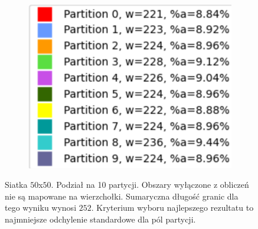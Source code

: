\begin{figure}[h]
\begin{subfigure}{.33\textwidth}
    \includegraphics[width=0.9\linewidth]{images/results/m_k/with/14/results}
    \caption[short]{}
\end{subfigure}
\caption{Siatka $50$x$50$. Podział na 10 partycji.
Obszary wyłączone z obliczeń nie są mapowane na wierzchołki.
Sumaryczna długość granic dla tego wyniku wynosi $252$.
Kryterium wyboru najlepszego rezultatu to najmniejsze odchylenie standardowe dla pól partycji.}
\label{result:14}
\end{figure}
